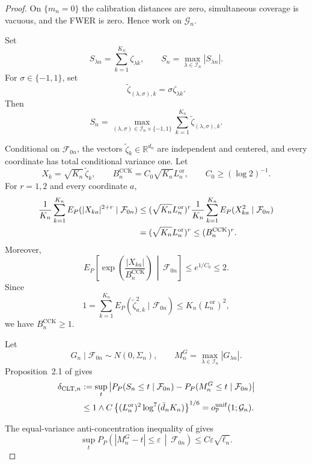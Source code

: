 \documentclass[11pt]{article}
\theoremstyle{definition}
\newcommand{\1}{\mathbf 1}\newcommand{\op}{\operatorname}
\begin{document}
\begin{proof}
On $\{m_n=0\}$ the calibration distances are zero, simultaneous
coverage is vacuous, and the FWER is zero. Hence work on $\mathcal G_n$.

Set
\[
S_{\lambda n}=\sum_{k=1}^{K_n}\zeta_{\lambda k},
\qquad
S_n=\max_{\lambda\in\mathcal I_n}|S_{\lambda n}|.
\]
For $\sigma\in\{-1,1\}$, set
\[
\widetilde\zeta_{(\lambda,\sigma),k}
=
\sigma\zeta_{\lambda k}.
\]
Then
\begin{equation}
S_n
=
\max_{(\lambda,\sigma)\in
\mathcal I_n\times\{-1,1\}}
\sum_{k=1}^{K_n}
\widetilde\zeta_{(\lambda,\sigma),k}.
\label{eq:signed-representation}
\end{equation}

Conditional on $\mathcal F_{0n}$, the vectors
$\widetilde\zeta_k\in\mathbb R^{d_n}$ are independent and centered,
and every coordinate has total conditional variance one. Let
\[
X_k=\sqrt{K_n}\,\widetilde\zeta_k,
\qquad
B_n^{\mathrm{CCK}}
=
C_0\sqrt{K_n}L_n^{\mathrm{or}},
\qquad
C_0\ge(\log2)^{-1}.
\]
For $r=1,2$ and every coordinate $a$,
\begin{align}
\frac1{K_n}\sum_{k=1}^{K_n}
E_P(|X_{ka}|^{2+r}\mid\mathcal F_{0n})
&\le
(\sqrt{K_n}L_n^{\mathrm{or}})^r
\frac1{K_n}\sum_{k=1}^{K_n}
E_P(X_{ka}^2\mid\mathcal F_{0n})
\notag\\
&=
(\sqrt{K_n}L_n^{\mathrm{or}})^r
\le
(B_n^{\mathrm{CCK}})^r.
\label{eq:CCK-moment-bound}
\end{align}
Moreover,
\[
E_P\!\left[
\exp\!\left(
\frac{|X_{ka}|}{B_n^{\mathrm{CCK}}}
\right)
\,\middle|\,
\mathcal F_{0n}
\right]
\le e^{1/C_0}\le2.
\]
Since
\[
1
=
\sum_{k=1}^{K_n}
E_P(\widetilde\zeta_{a,k}^2\mid\mathcal F_{0n})
\le K_n(L_n^{\mathrm{or}})^2,
\]
we have $B_n^{\mathrm{CCK}}\ge1$.

Let
\[
G_n\mid\mathcal F_{0n}\sim N(0,\Sigma_n),
\qquad
M_n^G=\max_{\lambda\in\mathcal I_n}|G_{\lambda n}|.
\]
Proposition~2.1 of
\citet{ChernozhukovChetverikovKato2017} gives
\begin{align}
\delta_{\mathrm{CLT},n}
&:=
\sup_t
\left|
P_P(S_n\le t\mid\mathcal F_{0n})
-
P_P(M_n^G\le t\mid\mathcal F_{0n})
\right|
\notag\\
&\le
1\wedge
C\left\{
(L_n^{\mathrm{or}})^2\log^7(\bar d_nK_n)
\right\}^{1/6}
=
o_{\mathbb P}^{\mathrm{unif}}(1;\mathcal G_n).
\label{eq:conditional-CCK}
\end{align}

The equal-variance anti-concentration inequality of
\citet{ChernozhukovChetverikovKato2015} gives
\begin{equation}
\sup_t
P_P\!\left(
|M_n^G-t|\le\varepsilon
\,\middle|\,
\mathcal F_{0n}
\right)
\le C\varepsilon\sqrt{\ell_n}.
\label{eq:Gaussian-anticoncentration}
\end{equation}


\end{proof}
\end{document}
